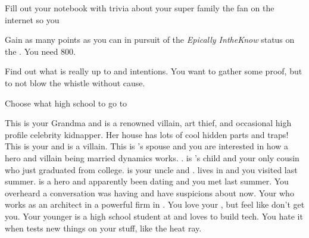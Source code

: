 \documentclass[char]{LRSguildcamp1}
\begin{document}
\begin{itemz}[Goals]
	\item Fill out your notebook with trivia about your super family the fan on the internet so you
	\item Gain as many points as you can in pursuit of the \textit{Epically IntheKnow} status on the \pTweenwebsite{}. You need 800. 
	\item Find out what \cAS{} is really up to and  intentions. You want to gather some proof, but to not blow the whistle without cause.
	\item Choose what high school to go to 
\end{itemz}

\begin{itemz}[Notes]
	\item 
\end{itemz}
\begin{contacts}
	\contact{\cGrandma{}} This is your Grandma and is a renowned villain, art thief, and occasional high profile celebrity kidnapper. Her house has lots of cool hidden parts and traps!
	\contact{\cOldest{}} This is your \cOldest{\uncle} and is a villain. 
	\contact{\cOS{}} This is \cOldest{}'s spouse and you are interested in how a hero and villain being married dynamics works. \cOS{\uncle}.
	\contact{\cGrad{}} \cGrad{} is \cOldest{}'s child and your only cousin who just graduated from college. 
	\contact{\cYoungest{}} \cYoungest{} is your uncle and \cYoungest{\hero}. \cYoungest{} lives in \pCityYoungest{} and you visited \cYoungest{\them} last summer.  
	\contact{\cYS{}} \cYS{} is a hero and apparently been dating \cYoungest{} and you met last summer. You overheard a conversation \cYS{} was having and have suspicions about  now.
	\contact{\cArchitect{}} Your \cArchitect{\parent} who works as an architect in a powerful firm in \pCityArchitect{}.  You love your \cArchitect{\parent}, but feel like \cArchitect{\they} don't get you.
	 	\contact{\cTeen{}} Your younger \cTeen{\sibling} is a high school student at \pNormalSchool{} and loves to build tech. You hate it when \cTeen{} tests new things on your stuff, like the heat ray. 
\end{contacts}
\end{document}
